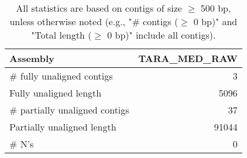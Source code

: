\documentclass[12pt,a4paper]{article}
\begin{document}
\begin{table}[ht]
\begin{center}
\caption{All statistics are based on contigs of size $\geq$ 500 bp, unless otherwise noted (e.g., "\# contigs ($\geq$ 0 bp)" and "Total length ($\geq$ 0 bp)" include all contigs).}
\begin{tabular}{|l*{1}{|r}|}
\hline
Assembly & TARA\_MED\_RAW \\ \hline
\# fully unaligned contigs & 3 \\ \hline
Fully unaligned length & 5096 \\ \hline
\# partially unaligned contigs & 37 \\ \hline
Partially unaligned length & 91044 \\ \hline
\# N's & 0 \\ \hline
\end{tabular}
\end{center}
\end{table}
\end{document}
